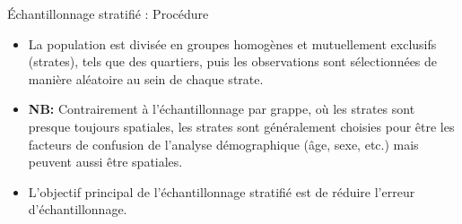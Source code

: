 \documentclass[ignorenonframetext,]{beamer}
\providecommand{\tightlist}{%
  \setlength{\itemsep}{0pt}\setlength{\parskip}{0pt}}
\begin{document}
\begin{frame}{Échantillonnage stratifié : Procédure}

\begin{itemize}
\tightlist
\item
  La population est divisée en groupes homogènes et mutuellement
  exclusifs (strates), tels que des quartiers, puis les observations
  sont sélectionnées de manière aléatoire au sein de chaque strate.
\item
  \textbf{NB:} Contrairement à l'échantillonnage par grappe, où les
  strates sont presque toujours spatiales, les strates sont généralement
  choisies pour être les facteurs de confusion de l'analyse
  démographique (âge, sexe, etc.) mais peuvent aussi être spatiales.
\item
  L'objectif principal de l'échantillonnage stratifié est de réduire
  l'erreur d'échantillonnage.
\end{itemize}

\end{frame}
\end{document}

